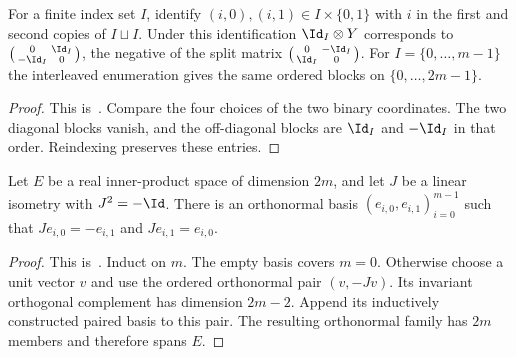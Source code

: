 \begin{lemma}
    \label{lem:mpu_standard_skew_indexing}
    \leanok
    For a finite index set $I$, identify $(i,0),(i,1)\in I\times\{0,1\}$
    with $i$ in the first and second copies of $I\sqcup I$. Under this
    identification $\Id_I\otimes Y$ corresponds to
    $\left(\begin{smallmatrix}0&\Id_I\\-\Id_I&0\end{smallmatrix}\right)$,
    the negative of the split matrix
    $\left(\begin{smallmatrix}0&-\Id_I\\\Id_I&0\end{smallmatrix}\right)$.
    For $I=\{0,\ldots,m-1\}$ the interleaved enumeration gives the same
    ordered blocks on $\{0,\ldots,2m-1\}$.
\end{lemma}
\begin{proof}\leanok
    This is~\cite[``Sign and indexing of the standard skew
        form'']{QICLean2026Blueprint}.
    Compare the four choices of the two binary coordinates. The two diagonal
    blocks vanish, and the off-diagonal blocks are $\Id_I$ and $-\Id_I$
    in that order. Reindexing preserves these entries.
\end{proof}

\begin{lemma}
    \label{lem:mpu_skew_paired_orthonormal_basis}
    \leanok
    Let $E$ be a real inner-product space of dimension $2m$, and let $J$ be
    a linear isometry with $J^2=-\Id$. There is an orthonormal basis
    $(e_{i,0},e_{i,1})_{i=0}^{m-1}$ such that
    $Je_{i,0}=-e_{i,1}$ and $Je_{i,1}=e_{i,0}$.
\end{lemma}
\begin{proof}\leanok
    This is~\cite[``Paired orthonormal basis'']{QICLean2026Blueprint}.
    Induct on $m$. The empty basis covers $m=0$. Otherwise choose a unit
    vector $v$ and use the ordered orthonormal pair $(v,-Jv)$.
    Its invariant orthogonal complement has dimension $2m-2$.
    Append its inductively constructed paired basis to this pair.
    The resulting orthonormal family has $2m$ members and therefore spans $E$.
\end{proof}

